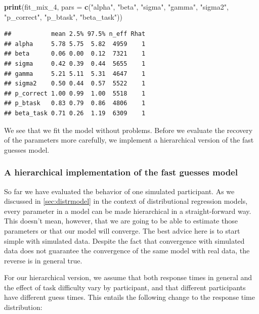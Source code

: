 \documentclass[12pt,]{krantz}
\newenvironment{Shaded}{\begin{snugshade}}{\end{snugshade}}
\newcommand{\KeywordTok}[1]{\textcolor[rgb]{0.13,0.29,0.53}{\textbf{#1}}}
\newcommand{\DataTypeTok}[1]{\textcolor[rgb]{0.13,0.29,0.53}{#1}}
\newcommand{\DecValTok}[1]{\textcolor[rgb]{0.00,0.00,0.81}{#1}}
\newcommand{\StringTok}[1]{\textcolor[rgb]{0.31,0.60,0.02}{#1}}
\newcommand{\NormalTok}[1]{#1}
\theoremstyle{definition}
\theoremstyle{definition}
\theoremstyle{definition}
\theoremstyle{remark}
\begin{document}
\begin{Shaded}
\begin{Highlighting}[]
\KeywordTok{print}\NormalTok{(fit_mix_}\DecValTok{4}\NormalTok{,}
      \DataTypeTok{pars =} \KeywordTok{c}\NormalTok{(}\StringTok{"alpha"}\NormalTok{, }\StringTok{"beta"}\NormalTok{, }\StringTok{"sigma"}\NormalTok{, }\StringTok{"gamma"}\NormalTok{, }\StringTok{"sigma2"}\NormalTok{,}
               \StringTok{"p_correct"}\NormalTok{, }\StringTok{"p_btask"}\NormalTok{, }\StringTok{"beta_task"}\NormalTok{))}
\end{Highlighting}
\end{Shaded}

\begin{verbatim}
##           mean 2.5% 97.5% n_eff Rhat
## alpha     5.78 5.75  5.82  4959    1
## beta      0.06 0.00  0.12  7321    1
## sigma     0.42 0.39  0.44  5655    1
## gamma     5.21 5.11  5.31  4647    1
## sigma2    0.50 0.44  0.57  5522    1
## p_correct 1.00 0.99  1.00  5518    1
## p_btask   0.83 0.79  0.86  4806    1
## beta_task 0.71 0.26  1.19  6309    1
\end{verbatim}

We see that we fit the model without problems. Before we evaluate the
recovery of the parameters more carefully, we implement a hierarchical
version of the fast guesses model.

\subsubsection{A hierarchical implementation of the fast guesses
model}\label{a-hierarchical-implementation-of-the-fast-guesses-model}

So far we have evaluated the behavior of one simulated participant. As
we discussed in \ref{sec:distrmodel} in the context of distributional
regression models, every parameter in a model can be made hierarchical
in a straight-forward way. This doesn't mean, however, that we are going
to be able to estimate those parameters or that our model will converge.
The best advice here is to start simple with simulated data. Despite the
fact that convergence with simulated data does not guarantee the
convergence of the same model with real data, the reverse is in general
true.

For our hierarchical version, we assume that both response times in
general and the effect of task difficulty vary by participant, and that
different participants have different guess times. This entails the
following change to the response time distribution:
\end{document}
